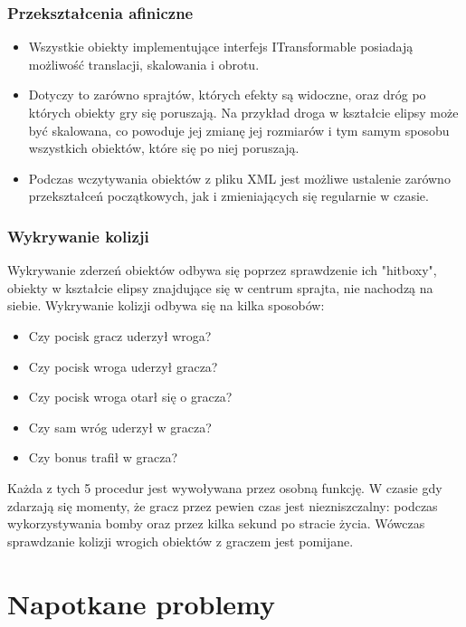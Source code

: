 \documentclass[a4paper,twoside]{article}
\begin{document}
		\section{Przekształcenia afiniczne}
			\begin{itemize}
				\item Wszystkie obiekty implementujące interfejs ITransformable posiadają możliwość translacji, skalowania i obrotu.
				\item Dotyczy to zarówno sprajtów, których efekty są widoczne, oraz dróg po których obiekty gry się poruszają. Na przykład droga w kształcie elipsy może być skalowana, co powoduje jej zmianę jej rozmiarów i tym samym sposobu wszystkich obiektów, które się po niej poruszają.
				\item Podczas wczytywania obiektów z pliku XML jest możliwe ustalenie zarówno przekształceń początkowych, jak i zmieniających się regularnie w czasie.
			\end{itemize}
		\section{Wykrywanie kolizji}
			Wykrywanie zderzeń obiektów odbywa się poprzez sprawdzenie ich "hitboxy", obiekty w kształcie elipsy znajdujące się w centrum sprajta, nie nachodzą na siebie. Wykrywanie kolizji odbywa się na kilka sposobów:
			\begin{itemize}
				\item Czy pocisk gracz uderzył wroga?
				\item Czy pocisk wroga uderzył gracza?
				\item Czy pocisk wroga otarł się o gracza?
				\item Czy sam wróg uderzył w gracza?
				\item Czy bonus trafił w gracza?
			\end{itemize}
			Każda z tych 5 procedur jest wywoływana przez osobną funkcję. W czasie gdy zdarzają się momenty, że gracz przez pewien czas jest niezniszczalny: podczas wykorzystywania bomby oraz przez kilka sekund po stracie życia. Wówczas sprawdzanie kolizji wrogich obiektów z graczem jest pomijane.
			
	
	
	\newpage
	\part{Napotkane problemy}
\end{document}
